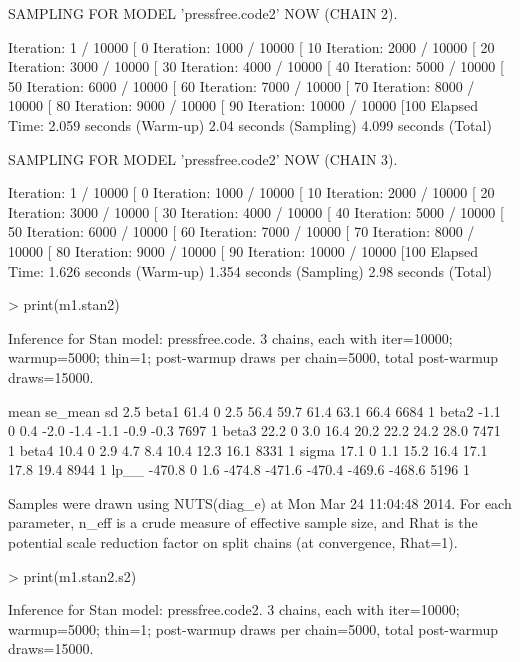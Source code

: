 \documentclass[12pt]{article}
\begin{document}
\begin{enumerate}
\begin{Schunk}
\begin{Soutput}
SAMPLING FOR MODEL 'pressfree.code2' NOW (CHAIN 2).

Iteration:    1 / 10000 [  0%
Iteration: 1000 / 10000 [ 10%
Iteration: 2000 / 10000 [ 20%
Iteration: 3000 / 10000 [ 30%
Iteration: 4000 / 10000 [ 40%
Iteration: 5000 / 10000 [ 50%
Iteration: 6000 / 10000 [ 60%
Iteration: 7000 / 10000 [ 70%
Iteration: 8000 / 10000 [ 80%
Iteration: 9000 / 10000 [ 90%
Iteration: 10000 / 10000 [100%
Elapsed Time: 2.059 seconds (Warm-up)
              2.04 seconds (Sampling)
              4.099 seconds (Total)

SAMPLING FOR MODEL 'pressfree.code2' NOW (CHAIN 3).

Iteration:    1 / 10000 [  0%
Iteration: 1000 / 10000 [ 10%
Iteration: 2000 / 10000 [ 20%
Iteration: 3000 / 10000 [ 30%
Iteration: 4000 / 10000 [ 40%
Iteration: 5000 / 10000 [ 50%
Iteration: 6000 / 10000 [ 60%
Iteration: 7000 / 10000 [ 70%
Iteration: 8000 / 10000 [ 80%
Iteration: 9000 / 10000 [ 90%
Iteration: 10000 / 10000 [100%
Elapsed Time: 1.626 seconds (Warm-up)
              1.354 seconds (Sampling)
              2.98 seconds (Total)
\end{Soutput}
\end{Schunk}

\pagebreak

\begin{Schunk}
\begin{Sinput}
> print(m1.stan2)
\end{Sinput}
\begin{Soutput}
Inference for Stan model: pressfree.code.
3 chains, each with iter=10000; warmup=5000; thin=1; 
post-warmup draws per chain=5000, total post-warmup draws=15000.

        mean se_mean  sd   2.5%
beta1   61.4       0 2.5   56.4   59.7   61.4   63.1   66.4  6684    1
beta2   -1.1       0 0.4   -2.0   -1.4   -1.1   -0.9   -0.3  7697    1
beta3   22.2       0 3.0   16.4   20.2   22.2   24.2   28.0  7471    1
beta4   10.4       0 2.9    4.7    8.4   10.4   12.3   16.1  8331    1
sigma   17.1       0 1.1   15.2   16.4   17.1   17.8   19.4  8944    1
lp__  -470.8       0 1.6 -474.8 -471.6 -470.4 -469.6 -468.6  5196    1

Samples were drawn using NUTS(diag_e) at Mon Mar 24 11:04:48 2014.
For each parameter, n_eff is a crude measure of effective sample size,
and Rhat is the potential scale reduction factor on split chains (at 
convergence, Rhat=1).
\end{Soutput}
\begin{Sinput}
> print(m1.stan2.s2)
\end{Sinput}
\begin{Soutput}
Inference for Stan model: pressfree.code2.
3 chains, each with iter=10000; warmup=5000; thin=1; 
post-warmup draws per chain=5000, total post-warmup draws=15000.


\end{Soutput}
\end{Schunk}
\end{enumerate}
\end{document}
